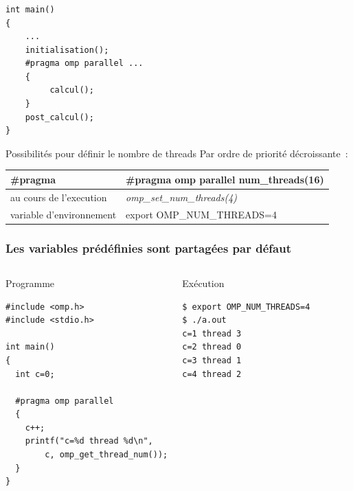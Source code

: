 \documentclass{beamer}
\begin{document}
\begin{frame}[fragile]
  \frametitle{}

\begin{verbatim}
int main()
{
    ...
    initialisation();
    #pragma omp parallel ...
    {
         calcul();
    }
    post_calcul();
}
\end{verbatim}

\begin{exampleblock}{Possibilités pour définir le nombre de threads}
Par ordre de priorité décroissante~:

\small
\begin{tabular}[ht]{|l@{~:~}l|}
\hline
\#pragma &   \#pragma omp parallel num\_threads(16) \\
\hline
au cours de l'execution &  {\it omp\_set\_num\_threads(4)} \\
\hline
variable d'environnement &  export OMP\_NUM\_THREADS=4 \\
\hline
\end{tabular}
\normalsize
\end{exampleblock}
\end{frame}



\begin{frame}[fragile]
  \frametitle{Les variables prédéfinies sont partagées par défaut}
  
  \begin{columns}[t]
  \column{5cm}
\begin{block}{Programme}
\begin{verbatim}
#include <omp.h>
#include <stdio.h>

int main()
{
  int c=0;

  #pragma omp parallel 
  {
    c++;
    printf("c=%d thread %d\n",
        c, omp_get_thread_num());
  }
}
\end{verbatim}
\end{block}
    
    
    \column{5cm}
\begin{block}{Exécution}    
  \small

\begin{verbatim}
$ export OMP_NUM_THREADS=4
$ ./a.out
c=1 thread 3
c=2 thread 0
c=3 thread 1
c=4 thread 2
\end{verbatim}
\end{block}    
  \end{columns}
\end{frame}
\end{document}
